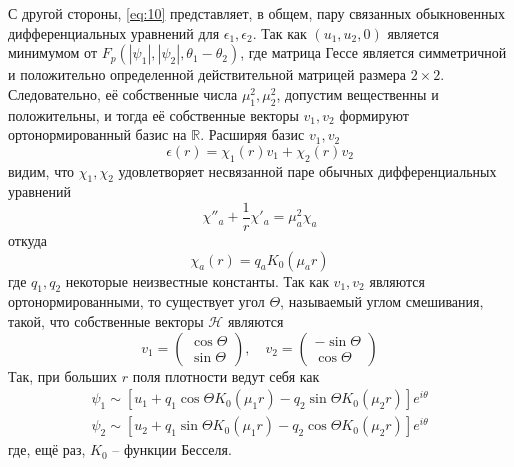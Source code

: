 С другой стороны, \eqref{eq:10} представляет, в общем, пару связанных 
обыкновенных дифференциальных уравнений для \( \epsilon_1, \epsilon_2 \). Так 
как \( (u_1, u_2, 0 ) \) является минимумом от 
\( F_p(|\psi_1|, |\psi_2|, \theta_1 - \theta_2) \), где матрица Гессе является  
симметричной и положительно определенной действительной матрицей размера 
\( 2\times2 \). Следовательно, её собственные числа \( \mu_1^2, \mu_2^2\), 
допустим вещественны и положительны, и тогда её собственные векторы 
\( v_1, v_2 \) формируют ортонормированный базис на \( \mathbb{R} \). Расширяя 
базис \( v_1, v_2 \)
\begin{equation}
    \epsilon(r) = \chi_1(r) v_1 + \chi_2(r) v_2
    \label{eq:17}
\end{equation}
видим, что \( \chi_1, \chi_2 \) удовлетворяет несвязанной паре обычных 
дифференциальных уравнений
\begin{equation}
    \chi''_a + \frac{1}{r}\chi'_a = \mu_a^2 \chi_a
    \label{eq:18}
\end{equation}
откуда
\begin{equation}
    \chi_a(r) = q_a K_0(\mu_a r)
    \label{eq:19}
\end{equation}
где \( q_1, q_2 \) некоторые неизвестные константы. Так как \( v_1, v_2 \) 
являются ортонормированными, то существует угол \( \Theta \), называемый углом 
смешивания, такой, что собственные векторы \( \mathcal{H} \) являются
\begin{equation}
    v_1 = \left( \begin{array}{c}
        \cos\Theta \\
        \sin\Theta
    \end{array} \right), \quad
    v_2 = \left( \begin{array}{c}
        -\sin\Theta \\
        \cos\Theta
    \end{array} \right)
    \label{eq:20}
\end{equation}
Так, при больших \( r \) поля плотности ведут себя как 
\begin{gather}
    \psi_1 \sim \left[ u_1 + q_1\cos\Theta K_0(\mu_1 r) - 
        q_2\sin\Theta K_0(\mu_2 r) \right]e^{i\theta} \nonumber \\
    \psi_2 \sim \left[ u_2 + q_1\sin\Theta K_0(\mu_1 r) - 
        q_2\cos\Theta K_0(\mu_2 r) \right]e^{i\theta}
    \label{eq:21}
\end{gather}
где, ещё раз, \( K_0 \) -- функции Бесселя.

